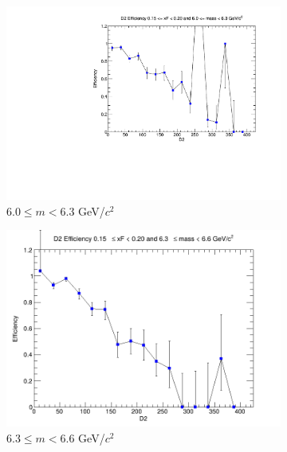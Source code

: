 \begin{figure}[p]
\begin{subfigure}[b]{0.32\textwidth}
        \includegraphics[width=\textwidth]{./kTrackerEfficiencyPlots/D2_Efficiency_xF3_mass6.pdf}
        \caption{$6.0 \leq m < 6.3$ GeV/$c^2$}
        \label{fig:xF3_mass6}
    \end{subfigure}
    \hfill
    \begin{subfigure}[b]{0.32\textwidth}
        \centering
        \includegraphics[width=\textwidth]{./kTrackerEfficiencyPlots/D2_Efficiency_xF3_mass7.png}
        \caption{$6.3 \leq m < 6.6$ GeV/$c^2$}
        \label{fig:xF3_mass7}
    \end{subfigure}
    \hfill
    \begin{subfigure}[b]{0.32\textwidth}
        \centering

\end{subfigure}
\end{figure}
